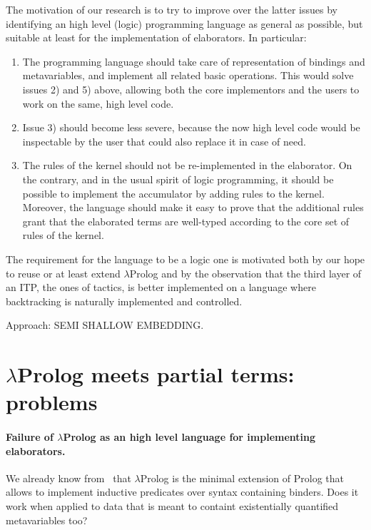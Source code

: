 \documentclass{easychair}
\begin{document}
The motivation of our research is to try to improve over the latter
issues by identifying an high level (logic) programming language as
general as possible, but suitable at least for the implementation of
elaborators. In particular:
\begin{enumerate}
\item The programming language should take care of representation of
	bindings and metavariables, and implement all related basic
	operations. This would solve issues 2) and 5) above, allowing
	both the core implementors and the users to work on the same,
	high level code.
\item Issue 3) should become less severe, because the now high level
	code would be inspectable by the user that could also replace
	it in case of need.
\item The rules of the kernel should not be re-implemented in the
	elaborator. On the contrary, and in the usual spirit of logic
	programming, it should be possible to implement the
	accumulator by adding rules to the kernel. Moreover, the
	language should make it easy to prove that the additional
	rules grant that the elaborated terms are well-typed according
	to the core set of rules of the kernel.
\end{enumerate}

The requirement for the language to be a logic one is motivated both
by our hope to reuse or at least extend $\lambda$Prolog and by the
observation that the third layer of an ITP, the ones of tactics, is
better implemented on a language where backtracking is naturally
implemented and controlled.

Approach: SEMI SHALLOW EMBEDDING.

\section{$\lambda$Prolog meets partial terms: problems}


\paragraph{Failure of $\lambda$Prolog as an high level language for
implementing elaborators.}
We already know from~\cite{jlp98} that $\lambda$Prolog is the minimal
extension of Prolog that allows to implement inductive predicates over
syntax containing binders. Does it work when applied to data that is
meant to containt existentially quantified metavariables too?
\end{document}
